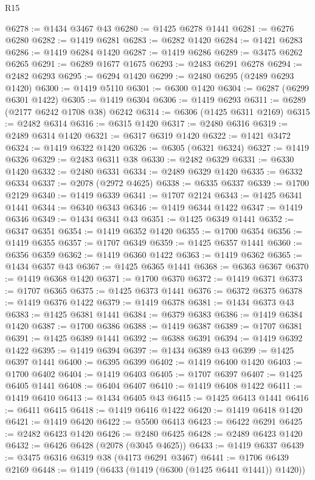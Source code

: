 \begin{lexlean}{R15}
\begin{coremodule}
@6278 := @1434 @3467 @43
@6280 := @1425 @6278 @1441
@6281 := @6276 @6280
@6282 := @1419 @6281
@6283 := @6282 @1420
@6284 := @1421 @6283
@6286 := @1419 @6284 @1420
@6287 := @1419 @6286
@6289 := @3475 @6262 @6265
@6291 := @6289 @1677 @1675
@6293 := @2483 @6291 @6278
@6294 := @2482 @6293
@6295 := @6294 @1420
@6299 := @2480 @6295 (@2489 @6293 @1420)
@6300 := @1419 @5110
@6301 := @6300 @1420
@6304 := @6287 (@6299 @6301 @1422)
@6305 := @1419 @6304
@6306 := @1419 @6293
@6311 := @6289 (@2177 @6242 @1708 @38) @6242
@6314 := @6306 (@1425 @6311 @2169)
@6315 := @2482 @6314
@6316 := @6315 @1420
@6317 := @2480 @6316
@6319 := @2489 @6314 @1420
@6321 := @6317 @6319 @1420
@6322 := @1421 @3472
@6324 := @1419 @6322 @1420
@6326 := @6305 (@6321 @6324)
@6327 := @1419 @6326
@6329 := @2483 @6311 @38
@6330 := @2482 @6329
@6331 := @6330 @1420
@6332 := @2480 @6331
@6334 := @2489 @6329 @1420
@6335 := @6332 @6334
@6337 := @2078 (@2972 @4625)
@6338 := @6335 @6337
@6339 := @1700 @2129
@6340 := @1419 @6339
@6341 := @1707 @2124
@6343 := @1425 @6341 @1441
@6344 := @6340 @6343
@6346 := @1419 @6344 @1422
@6347 := @1419 @6346
@6349 := @1434 @6341 @43
@6351 := @1425 @6349 @1441
@6352 := @6347 @6351
@6354 := @1419 @6352 @1420
@6355 := @1700 @6354
@6356 := @1419 @6355
@6357 := @1707 @6349
@6359 := @1425 @6357 @1441
@6360 := @6356 @6359
@6362 := @1419 @6360 @1422
@6363 := @1419 @6362
@6365 := @1434 @6357 @43
@6367 := @1425 @6365 @1441
@6368 := @6363 @6367
@6370 := @1419 @6368 @1420
@6371 := @1700 @6370
@6372 := @1419 @6371
@6373 := @1707 @6365
@6375 := @1425 @6373 @1441
@6376 := @6372 @6375
@6378 := @1419 @6376 @1422
@6379 := @1419 @6378
@6381 := @1434 @6373 @43
@6383 := @1425 @6381 @1441
@6384 := @6379 @6383
@6386 := @1419 @6384 @1420
@6387 := @1700 @6386
@6388 := @1419 @6387
@6389 := @1707 @6381
@6391 := @1425 @6389 @1441
@6392 := @6388 @6391
@6394 := @1419 @6392 @1422
@6395 := @1419 @6394
@6397 := @1434 @6389 @43
@6399 := @1425 @6397 @1441
@6400 := @6395 @6399
@6402 := @1419 @6400 @1420
@6403 := @1700 @6402
@6404 := @1419 @6403
@6405 := @1707 @6397
@6407 := @1425 @6405 @1441
@6408 := @6404 @6407
@6410 := @1419 @6408 @1422
@6411 := @1419 @6410
@6413 := @1434 @6405 @43
@6415 := @1425 @6413 @1441
@6416 := @6411 @6415
@6418 := @1419 @6416 @1422
@6420 := @1419 @6418 @1420
@6421 := @1419 @6420
@6422 := @5500 @6413
@6423 := @6422 @6291
@6425 := @2482 @6423 @1420
@6426 := @2480 @6425
@6428 := @2489 @6423 @1420
@6432 := @6426 @6428 (@2078 (@3045 @4625))
@6433 := @1419 @6337
@6439 := @3475 @6316 @6319 @38 (@4173 @6291 @3467)
@6441 := @1706 @6439 @2169
@6448 := @1419 (@6433 (@1419 (@6300 (@1425 @6441 @1441)) @1420))

\end{coremodule}
\end{lexlean}

